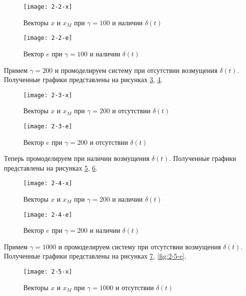 \documentclass[14pt, a4paper]{extarticle}
\begin{document}
\begin{enumerate}
		\begin{figure}[H]
			\centering
			\texttt{[image: 2-2-x]}
			\caption{Векторы $x$ и $x_M$ при $\gamma=100$ и наличии $\delta(t)$}
			\label{fig:2-2-x}
		\end{figure}
		
		\begin{figure}[H]
			\centering
			\texttt{[image: 2-2-e]}
			\caption{Вектор $e$ при $\gamma=100$ и наличии $\delta(t)$}
			\label{fig:2-2-e}
		\end{figure}
		
		Примем $\gamma=200$ и промоделируем систему при отсутствии возмущения $\delta(t)$. Полученные графики представлены на рисунках \ref{fig:2-3-x}, \ref{fig:2-3-e}.
		
		\begin{figure}[H]
			\centering
			\texttt{[image: 2-3-x]}
			\caption{Векторы $x$ и $x_M$ при $\gamma=200$ и отсутствии $\delta(t)$}
			\label{fig:2-3-x}
		\end{figure}
		
		\begin{figure}[H]
			\centering
			\texttt{[image: 2-3-e]}
			\caption{Вектор $e$ при $\gamma=200$ и отсутствии $\delta(t)$}
			\label{fig:2-3-e}
		\end{figure}
		
		Теперь промоделируем при наличии возмущения $\delta(t)$. Полученные графики представлены на рисунках \ref{fig:2-4-x}, \ref{fig:2-4-e}.
		
		\begin{figure}[H]
			\centering
			\texttt{[image: 2-4-x]}
			\caption{Векторы $x$ и $x_M$ при $\gamma=200$ и наличии $\delta(t)$}
			\label{fig:2-4-x}
		\end{figure}
		
		\begin{figure}[H]
			\centering
			\texttt{[image: 2-4-e]}
			\caption{Вектор $e$ при $\gamma=200$ и наличии $\delta(t)$}
			\label{fig:2-4-e}
		\end{figure}
		
		Примем $\gamma=1000$ и промоделируем систему при отсутствии возмущения $\delta(t)$. Полученные графики представлены на рисунках \ref{fig:2-5-x}, \ref{fig:2-5-e}.
		
		\begin{figure}[H]
			\centering
			\texttt{[image: 2-5-x]}
			\caption{Векторы $x$ и $x_M$ при $\gamma=1000$ и отсутствии $\delta(t)$}
			\label{fig:2-5-x}
		\end{figure}
		

\end{enumerate}
\end{document}
